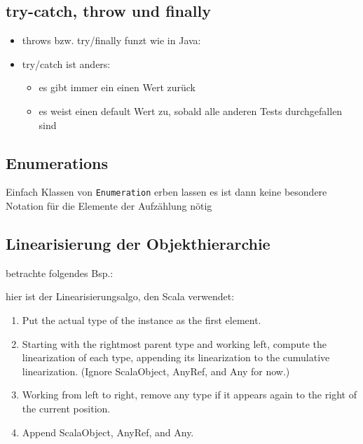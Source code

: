 \subsection{try-catch, throw und finally}
\begin{itemize}
  \item throws bzw. try/finally funzt wie in Java:
  
  
  
  \item try/catch ist anders:
  \begin{itemize}
    \item es gibt immer ein einen Wert zurück
    \item es weist einen default Wert zu, sobald alle anderen Tests
    durchgefallen sind
    
        
  \end{itemize}
\end{itemize}


\subsection{Enumerations}
Einfach Klassen von \texttt{Enumeration} erben lassen \und es ist dann
keine besondere Notation für die Elemente der Aufzählung nötig




\subsection{Linearisierung der Objekthierarchie}
betrachte folgendes Bsp.:




hier ist der Linearisierungsalgo, den Scala verwendet:

\begin{enumerate}
  \item Put the actual type of the instance as the first element.
  \item Starting with the rightmost parent type and working left, compute the linearization
of each type, appending its linearization to the cumulative linearization. (Ignore
ScalaObject, AnyRef, and Any for now.)
  \item Working from left to right, remove any type if it appears again to the right of the
current position.
  \item Append ScalaObject, AnyRef, and Any.
\end{enumerate}
\pagebreak


